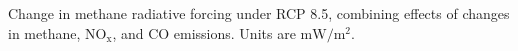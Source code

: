 Change in methane radiative forcing under RCP 8.5, combining effects of changes in methane, $\mathrm{NO_x}$, and CO emissions. Units are $\mathrm{mW/m^2}$.~\label{fig:drfcomb85}